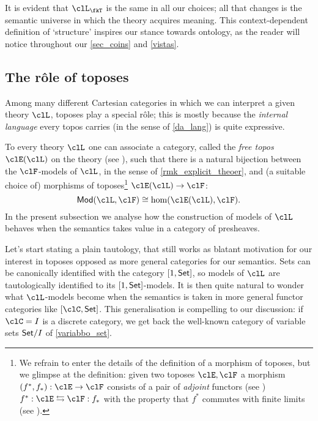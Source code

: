 It is evident that $\clL_{\fkT}$ is the same in all our choices; all that changes is the semantic universe in which the theory acquires meaning. This context-dependent definition of `structure' inspires our stance towards ontology, as the reader will notice throughout our \autoref{sec_coins} and \autoref{vistas}.

\subsection{The r\^ole of toposes}
Among many different Cartesian categories in which we can interpret a given theory $\clL$, toposes play a special r\^ole; this is mostly because the \emph{internal language} every topos carries (in the sense of \autoref{da_lang}) is quite expressive.

To every theory $\clL$ one can associate a category, called the \emph{free topos} $\clE(\clL)$ on the theory (see \cite{lambek1988introduction}), such that there is a natural bijection between the $\clF$-models of $\clL$, in the sense of  \autoref{rmk_explicit_theoer}, and (a suitable choice of) morphisms of toposes\footnote{We refrain to enter the details of the definition of a morphism of toposes, but we glimpse at the definition: given two toposes $\clE,\clF$ a morphism $(f^*,f_*): \clE \to \clF$ consists of a pair of \emph{adjoint} functors (see \cite[3]{Bor1}) $f^*: \clE \leftrightarrows \clF: f_*$ with the property that $f^*$ commutes with finite limits (see \cite[2.8.2]{Bor1}).} $\clE(\clL) \to \clF$:
\[\cate{Mod}(\clL, \clF) \cong \hom(\clE(\clL), \clF).\]
In the present subsection we analyse how the construction of models of $\clL$ behaves when the semantics takes value in a category of presheaves.%

Let's start stating a plain tautology, that still works as blatant motivation for our interest in toposes opposed as more general categories for our semantics. Sets can be canonically identified with the category $[1,\mathsf{Set}]$, so models of $\clL$ are tautologically identified to its $[1,\mathsf{Set}]$-models. It is then quite natural to wonder what $\clL$-models become when the semantics is taken in more general functor categories like $[\clC,\Set]$. This generalisation is compelling to our discussion: if $\clC=I$ is a discrete category, we get back the well-known category of variable sets $\mathsf{Set}/I$ of \autoref{variabbo_set}.

